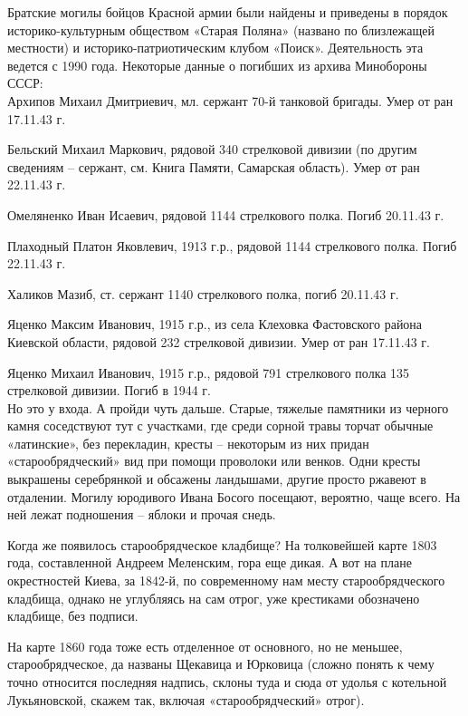 Братские могилы бойцов Красной армии были найдены и приведены в порядок историко-культурным обществом «Старая Поляна» (названо по близлежащей местности) и историко-патриотическим клубом «Поиск». Деятельность эта ведется с 1990 года. Некоторые данные о погибших из архива Минобороны СССР:\\ 

\noindent
Архипов Михаил Дмитриевич, мл. сержант 70-й танковой бригады. Умер от ран 17.11.43 г. 

\noindent
Бельский Михаил Маркович, рядовой 340 стрелковой дивизии (по другим сведениям – сержант, см. Книга Памяти, Самарская область). Умер от ран 22.11.43 г. 

\noindent
Омеляненко Иван Исаевич, рядовой 1144 стрелкового полка. Погиб 20.11.43 г.

\noindent
Плаходный Платон Яковлевич, 1913 г.р., рядовой 1144 стрелкового полка. Погиб 22.11.43 г. 

\noindent
Халиков Мазиб, ст. сержант 1140 стрелкового полка, погиб 20.11.43 г.

\noindent
Яценко Максим Иванович, 1915 г.р., из села Клеховка Фастовского района Киевской области, рядовой 232 стрелковой дивизии. Умер от ран 17.11.43 г. 

\noindent
Яценко Михаил Иванович, 1915 г.р., рядовой 791 стрелкового полка 135 стрелковой дивизии. Погиб в 1944 г.\\


Но это у входа. А пройди чуть дальше. Старые, тяжелые памятники из черного камня соседствуют тут с участками, где среди сорной травы торчат обычные «латинские», без перекладин, кресты – некоторым из них придан «старообрядческий» вид при помощи проволоки или венков. Одни кресты выкрашены серебрянкой и обсажены ландышами, другие просто ржавеют в отдалении. Могилу юродивого Ивана Босого посещают, вероятно, чаще всего. На ней лежат подношения – яблоки и прочая снедь.

Когда же появилось старообрядческое кладбище? На толковейшей карте 1803 года, составленной Андреем Меленским, гора еще дикая. А вот на плане окрестностей Киева, за 1842-й, по современному нам месту старообрядческого кладбища, однако не углубляясь на сам отрог, уже крестиками обозначено кладбище, без подписи.

На карте 1860 года тоже есть отделенное от основного, но не меньшее, старообрядческое, да названы Щекавица и Юрковица (сложно понять к чему точно относится последняя надпись, склоны туда и сюда от удолья с котельной Лукьяновской, скажем так, включая «старообрядческий» отрог).

